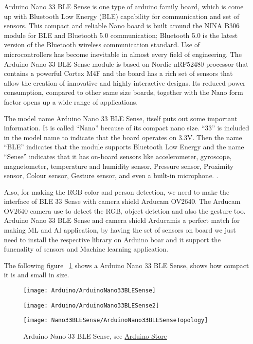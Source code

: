 Arduino Nano 33 BLE Sense is one type of arduino family board, which is come up with Bluetooth Low Energy (BLE) capability for communication and set of sensors. This compact and reliable Nano board is built around the NINA B306 module for BLE and Bluetooth 5.0 communication; Bluetooth 5.0 is the latest version of the Bluetooth wireless communication standard. Use of microcontrollers has become inevitable in almost every field of engineering.  The Arduino Nano 33 BLE Sense module is based on Nordic nRF52480 processor that contains a powerful Cortex M4F and the board has a rich set of sensors that allow the creation of innovative and highly interactive designs. Its reduced power consumption, compared to other same size boards, together with the Nano form factor opens up a wide range of applications. 



The model name Arduino Nano 33 BLE Sense, itself puts out some important information. It is called ``Nano'' because of its compact nano size. ``33'' is included in the model name to indicate that the board operates on 3.3V.  Then the name ``BLE'' indicates that the module supports Bluetooth Low Energy and the name ``Sense'' indicates that it has on-board sensors like accelerometer, gyroscope, magnetometer, temperature and humidity sensor, Pressure sensor, Proximity sensor, Colour sensor, Gesture sensor, and even a built-in microphone. \cite{Raj:2019}.


Also, for making the RGB color and person detection, we need to make the interface of BLE 33 Sense with camera shield Arducam OV2640. The Arducam OV2640 camera use  to detect the RGB, object detetion and also the gesture too. Arduino Nano 33 BLE Sense and camera shield Arducamis a perfect match for making ML and AI application, by having the set of sensors on board we just need to install the respective library on Arduino boar and it support the funcnality of sensors and Machine learning application.


The following figure ~\ref{ArduinoNano33} shows a Arduino Nano 33 BLE Sense, shows how compact it is and small in size.

\begin{figure}[ht]
    \centering
    \texttt{[image: Arduino/ArduinoNano33BLESense]}
    
    \texttt{[image: Arduino/ArduinoNano33BLESense2]}
 
    \texttt{[image: Nano33BLESense/ArduinoNano33BLESenseTopology]}
 
    
    \caption{Arduino Nano 33 BLE Sense, see \href{https://store.arduino.cc/arduino-nano-33-ble-sense}{Arduino Store}} 
    \label{ArduinoNano33}
\end{figure}



